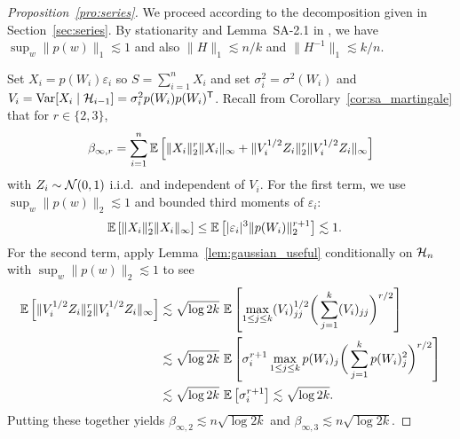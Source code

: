 \begin{proof}[Proposition~\ref{pro:series}]

  We proceed according to the decomposition given in
  Section~\ref{sec:series}.
  By stationarity and Lemma~SA-2.1 in
  \citet{cattaneo2020large},
  we have $\sup_w \|p(w)\|_1 \lesssim 1$
  and also $\|H\|_1 \lesssim n/k$
  and $\|H^{-1}\|_1 \lesssim k/n$.


  Set $X_i = p(W_i) \varepsilon_i$
  so $S = \sum_{i=1}^n X_i$
  and set $\sigma^2_i = \sigma^2(W_i)$ and
  $V_i = \operatorname{Var}[X_i \mid \mathcal{H}_{i-1}]
  = \sigma_i^2 p(W_i) p(W_i)^{\mathsf{T}}$.
  Recall from
  Corollary~\ref{cor:sa_martingale} that for $r \in \{2,3\}$,
  \begin{align*}
    \beta_{\infty,r}
    = \sum_{i=1}^n \mathbb{E}\left[\| X_i \|^r_2 \| X_i \|_\infty
    + \|V_i^{1/2} Z_i \|^r_2 \|V_i^{1/2} Z_i \|_\infty \right]
  \end{align*}
  with $Z_i \sim \mathcal{N}(0,1)$ i.i.d.\ and independent of $V_i$.
  For the first term, we use
  $\sup_w \|p(w)\|_2 \lesssim 1$
  and bounded third moments of $\varepsilon_i$:
  \begin{align*}
    \mathbb{E}\left[ \| X_i \|^r_2 \| X_i \|_\infty \right]
    &\leq
    \mathbb{E}\left[ |\varepsilon_i|^3 \| p(W_i) \|^{r+1}_2 \right]
    \lesssim 1.
  \end{align*}
  For the second term, apply Lemma~\ref{lem:gaussian_useful} conditionally on
  $\mathcal{H}_n$ with $\sup_w \|p(w)\|_2 \lesssim 1$ to see
  \begin{align*}
    \mathbb{E}\left[ \|V_i^{1/2} Z_i \|^r_2 \|V_i^{1/2} Z_i \|_\infty \right]
    &\lesssim
    \sqrt{\log 2k} \
    \mathbb{E}\left[
      \max_{1 \leq j \leq k}
      (V_i)_{j j}^{1/2}
      \bigg( \sum_{j=1}^k (V_i)_{j j} \bigg)^{r/2}
    \right] \\
    &\lesssim
    \sqrt{\log 2k} \
    \mathbb{E}\left[
      \sigma_i^{r+1}
      \max_{1 \leq j \leq k}
      p(W_i)_j
      \bigg(
        \sum_{j=1}^k
        p(W_i)_{j}^2
      \bigg)^{r/2}
    \right] \\
    &\lesssim
    \sqrt{\log 2k} \
    \mathbb{E}\left[
      \sigma_i^{r+1}
    \right]
    \lesssim
    \sqrt{\log 2k}.
  \end{align*}
  Putting these together yields
  $\beta_{\infty,2} \lesssim n \sqrt{\log 2k}$
  and $\beta_{\infty,3} \lesssim n \sqrt{\log 2k}$.

  \proofparagraph{bounding $\Omega$}


\end{proof}

